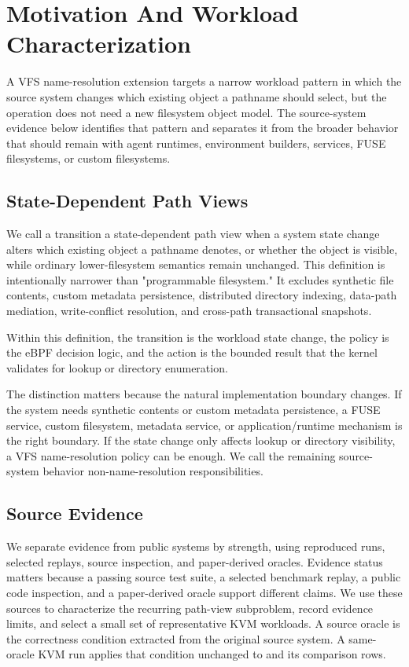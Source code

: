\section{Motivation And Workload Characterization}
\label{sec:workload-characterization}

A VFS name-resolution extension targets a narrow workload pattern in which the
source system changes which existing object a pathname should select, but the
operation does not need a new filesystem object model.
The source-system evidence below identifies that pattern and separates it from
the broader behavior that should remain with agent runtimes, environment
builders, services, FUSE filesystems, or custom filesystems.

\subsection{State-Dependent Path Views}

We call a transition a state-dependent path view when a system state change
alters which existing object a pathname denotes, or whether the object is
visible, while ordinary lower-filesystem semantics remain unchanged. This
definition is intentionally narrower than "programmable filesystem." It
excludes synthetic file contents, custom metadata persistence, distributed
directory indexing, data-path mediation, write-conflict resolution, and
cross-path transactional snapshots.

Within this definition, the transition is the workload state change, the policy
is the eBPF decision logic, and the action is the bounded result that the kernel
validates for lookup or directory enumeration.

The distinction matters because the natural implementation boundary changes.
If the system needs synthetic contents or custom metadata persistence, a FUSE
service, custom filesystem, metadata service, or application/runtime mechanism
is the right boundary. If the state change only affects lookup or directory
visibility, a VFS name-resolution policy can be enough. We call the remaining
source-system behavior non-name-resolution responsibilities.

\subsection{Source Evidence}

We separate evidence from public systems by strength, using reproduced runs,
selected replays, source inspection, and paper-derived oracles. Evidence status
matters because a passing source test suite, a selected benchmark replay, a
public code inspection, and a paper-derived oracle support different claims. We
use these sources to characterize the recurring path-view subproblem, record
evidence limits, and select a small set of representative KVM workloads.
A source oracle is the correctness condition extracted from the original source
system. A same-oracle KVM run applies that condition unchanged to \namei and its
comparison rows.

